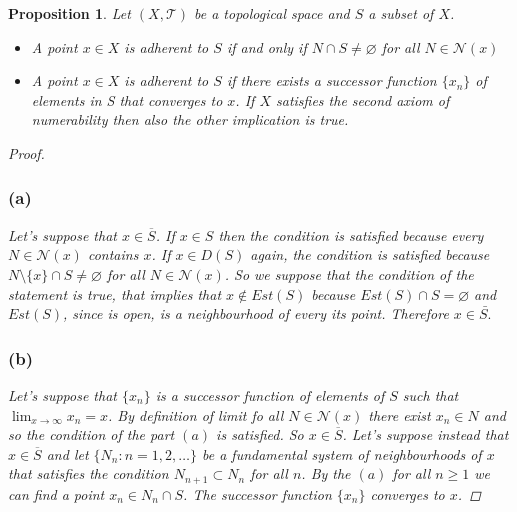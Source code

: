 \documentclass{article}
\newtheorem{proposition}{Proposition}
\begin{document}
    \begin{proposition}
        Let $(X, \mathcal{T})$ be a topological space and $S$ a subset of $X$.
        \begin{itemize}
            \item[a)] A point $x\in X$ is adherent to $S$ if and only if $N \cap S \neq \varnothing$ for all $N\in \mathcal{N}(x)$ 
            \item[b)] A point $x\in X$ is adherent to $S$ if there exists a successor function $\{x_n \}$ of elements in S that converges to $x$. If $X$ satisfies the second axiom of numerability then also the other implication is true. 
        \end{itemize}
        \begin{proof}
            \subsubsection*{(a)} Let's suppose that $x \in \overline{S}$. If $x \in S$ then the condition is satisfied because every $N\in \mathcal{N}(x)$ contains $x$. If $x\in D(S)$ again, the condition is satisfied because $N\setminus \{x \}\cap S \neq \varnothing $ for all $N\in \mathcal{N}(x)$. So we suppose that the condition of the statement is true, that implies that $x \notin Est(S)$ because $Est(S)\cap S = \varnothing$ and $Est(S)$, since is open, is a neighbourhood of every its point. Therefore $x\in \bar{S.}$
            \subsubsection*{(b)} Let's suppose that $\{ x_n \}$ is a successor function of elements of $S$ such that $\lim_{x \to \infty} x_n = x$. By definition of limit fo all $N \in \mathcal{N}(x)$ there exist $x_n \in N$ and so the condition of the part $(a)$ is satisfied. So $x\in \overline{S}$. Let's suppose instead that $x\in \overline{S}$ and let $\{ N_n : n=1,2,\ldots  \}$ be a fundamental system of neighbourhoods of $x$ that satisfies the condition $N_{n+1} \subset N_n$ for all $n$. By the $(a)$ for all $n \geq 1$ we can find a point $x_n \in N_n \cap S$. The successor function $\{ x_n \}$ converges to $x$.
        \end{proof}
    \end{proposition}
    \newpage
\end{document}
